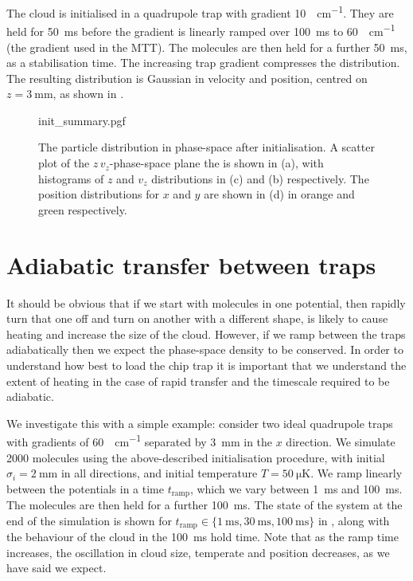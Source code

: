 The cloud is initialised in a quadrupole trap with gradient
\SI{10}{\gauss\per\centi\meter}. They are held for \SI{50}{\milli\second}
before the gradient is linearly ramped over \SI{100}{\milli\second} to
\SI{60}{\gauss\per\centi\meter} (the gradient used in the MTT).  The molecules are
then held for a further \SI{50}{\milli\second}, as a stabilisation time. The
increasing trap gradient compresses the distribution. The resulting
distribution is Gaussian in velocity and position, centred on
$z=\SI{3}{\milli\meter}$, as shown in .

\begin{figure}[htb]
\centering
  {init_summary.pgf}
  \caption{ The particle distribution in phase-space after initialisation. A
  scatter plot of the $z\,v_z$-phase-space plane the is shown in (a), with
  histograms of $z$ and $v_z$ distributions in (c) and (b) respectively. The
  position distributions for $x$ and $y$ are shown in (d) in orange and green
  respectively.}
  \label{sim:fig:initsum}
\end{figure}

\section{Adiabatic transfer between traps}
\label{sim:adiabatic}

It should be obvious that if we start with molecules in one potential, then
rapidly turn that one off and turn on another with a different shape, is likely
to cause heating and increase the size of the cloud.  However, if we ramp
between the traps adiabatically then we expect the phase-space density to be
conserved. In order to understand how best to load the chip trap it is
important that we understand the extent of heating in the case of rapid
transfer and the timescale required to be adiabatic.

We investigate this with a simple example: consider two ideal quadrupole traps
with gradients of \SI{60}{\gauss\per\centi\meter} separated by
\SI{3}{\milli\meter} in the $x$ direction. We simulate 2000 \CaF{} molecules
using the above-described initialisation procedure, with initial $\sigma_i =
\SI{2}{\milli\meter}$ in all directions, and initial temperature
$T=\SI{50}{\micro\kelvin}$. We ramp linearly between the potentials in a time
$t_\text{ramp}$, which we vary between \SI{1}{\milli\second} and
\SI{100}{\milli\second}. The molecules are then held for a further
\SI{100}{\milli\second}. The state of the system at the end of the simulation
is shown for $t_\text{ramp}\in \{\SI{1}{\milli\second}, \SI{30}{\milli\second},
\SI{100}{\milli\second}\}$ in , along with the
behaviour of the cloud in the \SI{100}{\milli\second} hold time. Note that as
the ramp time increases, the oscillation in cloud size, temperate and position
decreases, as we have said we expect.

